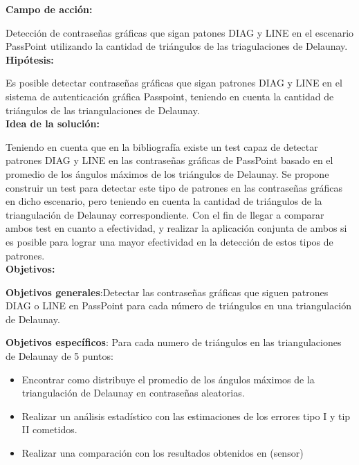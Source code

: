 \documentclass[12pt]{report}
\begin{document}
		   
	\large{\textbf{Campo de acción:}}
	
	\normalsize{Detección de contraseñas gráficas que sigan patones DIAG y LINE en el escenario PassPoint   utilizando  la cantidad de triángulos de las triagulaciones de Delaunay}.\\
	 
	\large{\textbf{Hipótesis:}}

	\normalsize{Es posible detectar contraseñas gráficas que sigan patrones DIAG y LINE en el sistema de autenticación gráfica Passpoint, teniendo en cuenta la cantidad de triángulos  de las triangulaciones de Delaunay}.\\
		
	
	\large{\textbf{Idea de la solución:}}
	
	\normalsize{
		Teniendo en cuenta que en la bibliografía existe un test capaz de detectar patrones DIAG y LINE en las contraseñas gráficas de PassPoint basado en el promedio de los ángulos máximos de los triángulos de Delaunay. Se propone construir un test para detectar este tipo de patrones en las contraseñas gráficas en dicho escenario, pero teniendo en cuenta la cantidad de triángulos de la triangulación de Delaunay correspondiente. Con el fin de llegar a comparar ambos test en cuanto a efectividad, y realizar la aplicación conjunta de ambos si es posible para lograr una mayor efectividad en la detección de estos tipos de patrones.
		}\\

	\large{\textbf{Objetivos:}}
	
	\normalsize{\textbf{Objetivos generales}}:Detectar\cite{1} las contraseñas gráficas que siguen patrones DIAG o LINE en PassPoint para cada número de triángulos en una triangulación de Delaunay\cite{1}.
	
	\normalsize{\textbf{Objetivos específicos}}:
	Para cada numero de triángulos  en las triangulaciones de Delaunay de 5 puntos:
	
	\begin{itemize}
		\item Encontrar como distribuye el promedio de los ángulos máximos de la triangulación de Delaunay en contraseñas aleatorias.
		 
		\item Realizar un análisis estadístico con las estimaciones de los errores tipo I y tip II cometidos.
		
		\item Realizar una comparación con los resultados obtenidos en (sensor)
		
	\end{itemize}
	
\end{document}
